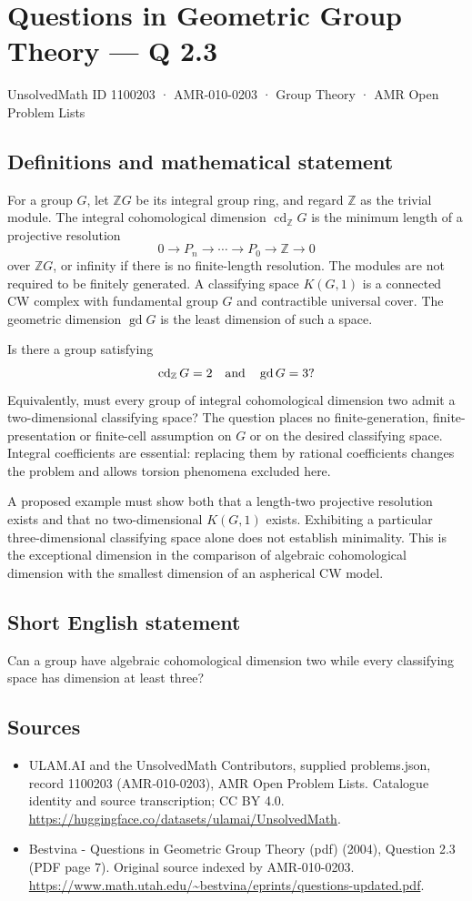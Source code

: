 \documentclass[11pt,a4paper]{article}
\begin{document}
\section*{Questions in Geometric Group Theory — Q 2.3}\label{1100203}
{\small UnsolvedMath ID 1100203 · AMR-010-0203 · Group Theory · AMR Open Problem Lists}
\subsection{Definitions and mathematical statement}
For a group $G$, let $\mathbb ZG$ be its integral group ring, and regard $\mathbb Z$ as the trivial module. The integral cohomological dimension $\operatorname{cd}_{\mathbb Z}G$ is the minimum length of a projective resolution
\[
 0\longrightarrow P_n\longrightarrow\cdots\longrightarrow P_0
 \longrightarrow\mathbb Z\longrightarrow0
\]
over $\mathbb ZG$, or infinity if there is no finite-length resolution. The modules are not required to be finitely generated. A classifying space $K(G,1)$ is a connected CW complex with fundamental group $G$ and contractible universal cover. The geometric dimension $\operatorname{gd}G$ is the least dimension of such a space.

Is there a group satisfying
\[
 \operatorname{cd}_{\mathbb Z}G=2\quad\hbox{and}\quad
 \operatorname{gd}G=3?
\]
Equivalently, must every group of integral cohomological dimension two admit a two-dimensional classifying space? The question places no finite-generation, finite-presentation or finite-cell assumption on $G$ or on the desired classifying space. Integral coefficients are essential: replacing them by rational coefficients changes the problem and allows torsion phenomena excluded here.

A proposed example must show both that a length-two projective resolution exists and that no two-dimensional $K(G,1)$ exists. Exhibiting a particular three-dimensional classifying space alone does not establish minimality. This is the exceptional dimension in the comparison of algebraic cohomological dimension with the smallest dimension of an aspherical CW model.
\subsection{Short English statement}
Can a group have algebraic cohomological dimension two while every classifying space has dimension at least three?
\subsection{Sources}
\begin{itemize}
\item[S1] ULAM.AI and the UnsolvedMath Contributors, supplied problems.json, record 1100203 (AMR-010-0203), AMR Open Problem Lists. Catalogue identity and source transcription; CC BY 4.0.
\url{https://huggingface.co/datasets/ulamai/UnsolvedMath}.
\item[S2] Bestvina - Questions in Geometric Group Theory (pdf) (2004), Question 2.3 (PDF page 7). Original source indexed by AMR-010-0203.
\url{https://www.math.utah.edu/~bestvina/eprints/questions-updated.pdf}.
\end{itemize}
\end{document}
